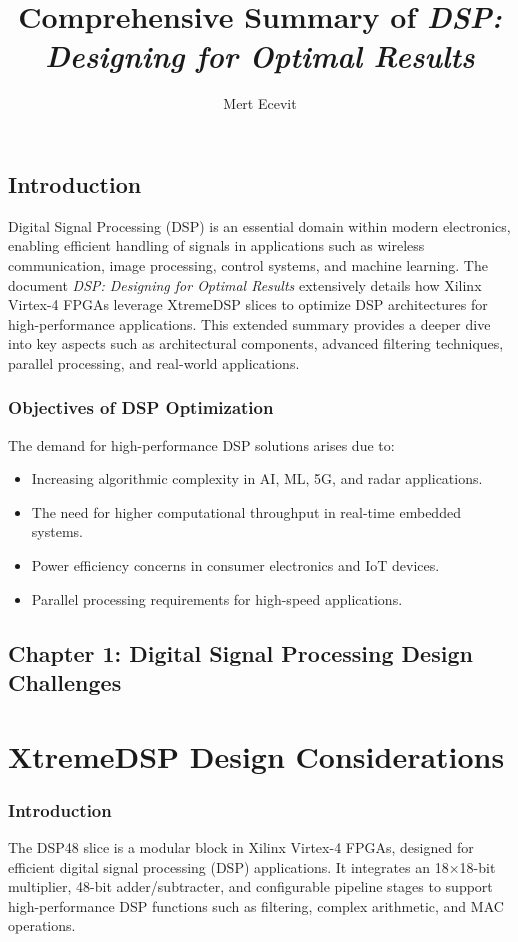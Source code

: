 \documentclass{article}
\title{Comprehensive Summary of \textit{DSP: Designing for Optimal Results}}
\author{Mert Ecevit}
\begin{document}
	
	\maketitle
	
	\tableofcontents
	\newpage
	
	\section{Introduction}
	Digital Signal Processing (DSP) is an essential domain within modern electronics, enabling efficient handling of signals in applications such as wireless communication, image processing, control systems, and machine learning. The document \textit{DSP: Designing for Optimal Results} extensively details how Xilinx Virtex-4 FPGAs leverage XtremeDSP slices to optimize DSP architectures for high-performance applications. This extended summary provides a deeper dive into key aspects such as architectural components, advanced filtering techniques, parallel processing, and real-world applications.
	
	\subsection{Objectives of DSP Optimization}
	The demand for high-performance DSP solutions arises due to:
	\begin{itemize}
		\item Increasing algorithmic complexity in AI, ML, 5G, and radar applications.
		\item The need for higher computational throughput in real-time embedded systems.
		\item Power efficiency concerns in consumer electronics and IoT devices.
		\item Parallel processing requirements for high-speed applications.
	\end{itemize}
	
	
	\section{Chapter 1: Digital Signal Processing Design Challenges}
	\chapter{XtremeDSP Design Considerations}
	
	\subsection{Introduction}
	The DSP48 slice is a modular block in Xilinx Virtex-4 FPGAs, designed for efficient digital signal processing (DSP) applications. It integrates an 18×18-bit multiplier, 48-bit adder/subtracter, and configurable pipeline stages to support high-performance DSP functions such as filtering, complex arithmetic, and MAC operations.
	
\end{document}

